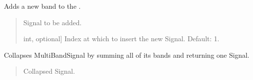 \documentclass[letterpaper,10pt,english]{sphinxmanual}
\begin{document}
\begin{fulllineitems}
\begin{fulllineitems}
\label{\detokenize{classes:dsptoolbox.classes.multibandsignal.MultiBandSignal.add_band}}
\pysigstartsignatures
{}
\pysigstopsignatures
\sphinxAtStartPar
Adds a new band to the .
\begin{quote}\begin{description}
\begin{description}
\sphinxlineitem{\sphinxstylestrong{sig}}{[}\sphinxtitleref{Signal}{]}
\sphinxAtStartPar
Signal to be added.

\sphinxlineitem{\sphinxstylestrong{index}}{[}int, optional{]}
\sphinxAtStartPar
Index at which to insert the new Signal. Default: \sphinxhyphen{}1.

\end{description}

\end{description}\end{quote}

\end{fulllineitems}


\begin{fulllineitems}
\label{\detokenize{classes:dsptoolbox.classes.multibandsignal.MultiBandSignal.bands}}
\pysigstartsignatures
{}
\pysigstopsignatures
\end{fulllineitems}


\begin{fulllineitems}
\label{\detokenize{classes:dsptoolbox.classes.multibandsignal.MultiBandSignal.collapse}}
\pysigstartsignatures
{}
\pysigstopsignatures
\sphinxAtStartPar
Collapses MultiBandSignal by summing all of its bands and returning
one Signal.
\begin{quote}\begin{description}
\begin{description}
\sphinxlineitem{\sphinxstylestrong{new\_sig}}{[}\sphinxtitleref{Signal}{]}
\sphinxAtStartPar
Collapsed Signal.


\end{description}
\end{description}
\end{quote}
\end{fulllineitems}
\end{fulllineitems}
\end{document}
